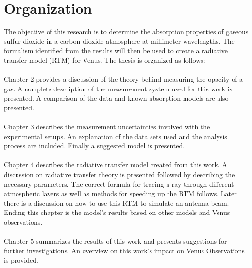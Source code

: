 \section{Organization}
The objective of this research is to determine the absorption properties of gaseous sulfur dioxide in a carbon dioxide atmosphere at millimeter wavelengths. The formalism identified from the results will then be used to create a radiative transfer model (RTM) for Venus. The thesis is organized as follows:
\\ \\
\noindent Chapter 2 provides a discussion of the theory behind measuring the opacity of a gas. A complete description of the measurement system used for this work is presented. A comparison of the data and known absorption models are also presented. 
\\ \\
\noindent Chapter 3 describes the measurement uncertainties involved with the experimental setups. An explanation of the data sets used and the analysis process are included. Finally a suggested model is presented.
\\ \\
\noindent Chapter 4 describes the radiative transfer model created from this work. A discussion on radiative transfer theory is presented followed by describing the necessary parameters. The correct formula for tracing a ray through different atmospheric layers as well as methods for speeding up the RTM follows. Later there is a discussion on how to use this RTM to simulate an antenna beam. Ending this chapter is the model's results based on other models and Venus observations.
\\ \\
\noindent Chapter 5 summarizes the results of this work and presents suggestions for further investigations. An overview on this work's impact on Venus Observations is provided.
